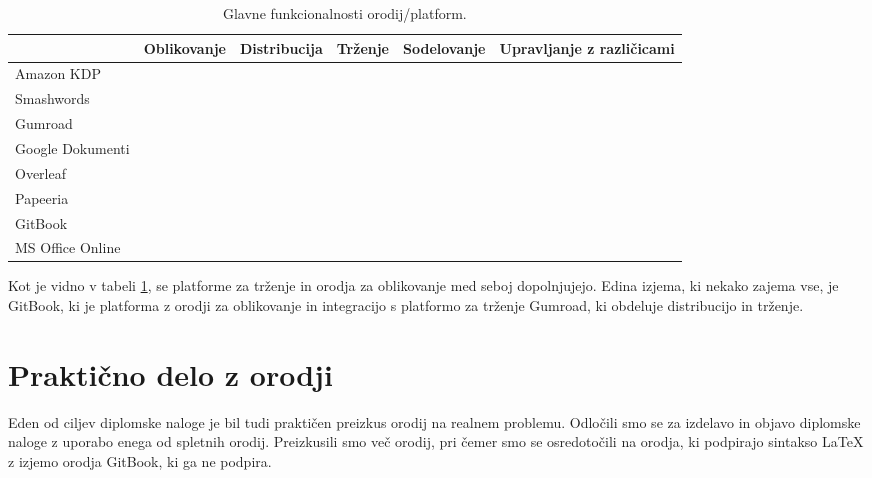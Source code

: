 \documentclass[a4paper, 12pt]{book}
\begin{document}
\begin{table}[h]
	\begin{center}
		\begin{tabular}{ | l | m{1.5cm} | m{1.5cm} |m{1.5cm} | m{1.5cm} | m{1.8cm} |}
			\hline
			& \hspace*{0pt}Oblikovanje & \hspace*{0pt}Distribucija & \hspace*{0pt}Trženje & \hspace*{0pt}Sodelovanje & \hspace*{0pt}Upravljanje z različicami  \\ \hline
			Amazon KDP       &  & \checkmark & \checkmark &  &  \checkmark  \\
			Smashwords       &  & \checkmark & \checkmark &  &  \checkmark  \\
			Gumroad          &  & \checkmark & \checkmark &  &  \checkmark   \\
			Google Dokumenti & \checkmark &  &  & \checkmark & \checkmark  \\
			Overleaf         & \checkmark & \checkmark &  & \checkmark & \checkmark \\	
			Papeeria         & \checkmark & & \checkmark & \checkmark & \checkmark \\
			GitBook          & \checkmark & \checkmark & \checkmark & \checkmark & \checkmark   \\	 
			MS Office Online & \checkmark & & \checkmark & \checkmark & \checkmark \\
			\hline
		\end{tabular}
	\end{center} 
	\caption{Glavne funkcionalnosti orodij/platform.}
	\label{tbl:platforme_in_orodja}
\end{table}

Kot je vidno v tabeli \ref{tbl:platforme_in_orodja}, se platforme za trženje in orodja za oblikovanje med seboj dopolnjujejo. Edina izjema, ki nekako zajema vse, je GitBook, ki je platforma z orodji za oblikovanje in integracijo s platformo za trženje Gumroad, ki obdeluje distribucijo in trženje.

\chapter{Praktično delo z orodji}
Eden od ciljev diplomske naloge je bil tudi praktičen preizkus orodij na realnem problemu. Odločili smo se za izdelavo in objavo diplomske naloge z uporabo enega od spletnih orodij. Preizkusili smo več orodij, pri čemer smo se osredotočili na orodja, ki podpirajo sintakso {\LaTeX} z izjemo orodja GitBook, ki ga ne podpira.
\end{document}
